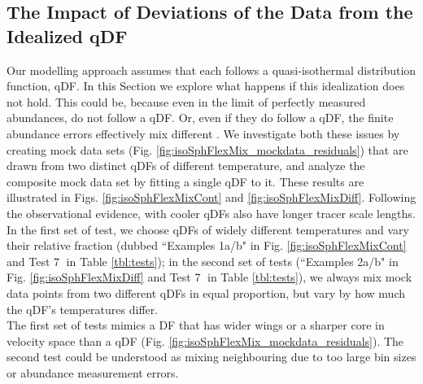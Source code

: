 \subsection{The Impact of Deviations of the Data from the Idealized qDF} \label{sec:results_mixedDFs}

Our modelling approach assumes that each \MAP follows a quasi-isothermal distribution function, qDF. In this Section we explore what happens if this idealization does not hold. This could be, because even in the limit of perfectly measured abundances, \MAPs do not follow a qDF. Or, even if they do follow a qDF, the finite abundance errors effectively mix different \MAPs. We investigate both these issues by creating mock data sets (Fig. \ref{fig:isoSphFlexMix_mockdata_residuals}) that are drawn from two distinct qDFs of different temperature, and analyze the composite mock data set by fitting a single qDF to it. These results are illustrated in Figs. \ref{fig:isoSphFlexMixCont} and \ref{fig:isoSphFlexMixDiff}. Following the observational evidence, \MAPs with cooler qDFs also have longer tracer scale lengths. In the first set of test, we choose qDFs of widely different temperatures and vary their relative fraction (dubbed ``Examples 1a/b" in Fig. \ref{fig:isoSphFlexMixCont} and Test \textcircled{7} in Table \ref{tbl:tests}); in the second set of tests (``Examples 2a/b" in Fig. \ref{fig:isoSphFlexMixDiff} and Test \textcircled{7} in Table \ref{tbl:tests}), we always mix mock data points from two different qDFs in equal proportion, but vary by how much the qDF's temperatures differ. 
\\The first set of tests mimics a DF that has wider wings or a sharper core in velocity space than a qDF (Fig. \ref{fig:isoSphFlexMix_mockdata_residuals}). The second test could be understood as mixing neighbouring \MAPs due to too large bin sizes or abundance measurement errors.

